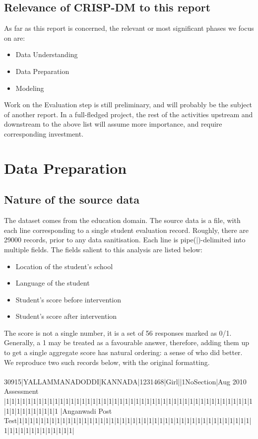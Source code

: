 \documentclass[10pt]{article}
\begin{document}
\subsection{Relevance of CRISP-DM to this report}
As far as this report is concerned, the relevant or most significant phases we focus on are:
\begin{itemize}
\item Data Understanding
\item Data Preparation
\item Modeling
\end{itemize}

Work on the Evaluation step is still preliminary, and will probably be the subject of another report. In a full-fledged project, the rest of the activities upstream and downstream to the above list will assume more importance, and require corresponding investment.

\newpage
\section{Data Preparation}
\subsection{Nature of the source data}
The dataset comes from the education domain. The source data is a file, with each line corresponding to a single student evaluation record. Roughly, there are 29000 records, prior to any data sanitisation. Each line is pipe(|)-delimited into multiple fields. The fields salient to this analysis are listed below:

\begin{itemize}
\item Location of the student's school
\item Language of the student
\item Student's score before intervention
\item Student's score after intervention
\end{itemize}

The score is not a single number, it is a set of 56 responses marked as 0/1. Generally, a 1 may be treated as a favourable answer, therefore, adding them up to get a single aggregate score has natural ordering: a sense of who did better. We reproduce two such records below, with the original formatting.\\\\
{\footnotesize
30915|YALLAMMANADODDI|KANNADA|1231468|Girl||1NoSection|Aug 2010 Assessment
|1|1|1|1|1|1|1|1|1|1|1|1|1|1|1|1|1|1|1|1|1|1|1|1|1|1|1|1|1|1|1|1|1|1|1|1|1|1|1|1|1|1|1|1|1|1|1|1|1|1|1|1|1|1|1|1
|Anganwadi Post Test|1|1|1|1|1|1|1|1|1|1|1|1|1|1|1|1|1|1|1|1|1|1|1|1|1|1|1|1|1|1|1|1|1|1|1|1|1|1|1|1|1|1|1|1|1|1|1|1|1|1|1|1|1|1|1|1|}\\
\end{document}
